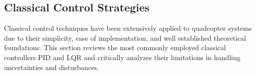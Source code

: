 \subsection{Classical Control Strategies}

Classical control techniques have been extensively applied to quadcopter systems due to their simplicity, ease of implementation, and well established theoretical foundations. This section reviews the most commonly employed classical controllers PID and LQR and critically analyzes their limitations in handling uncertainties and disturbances.





